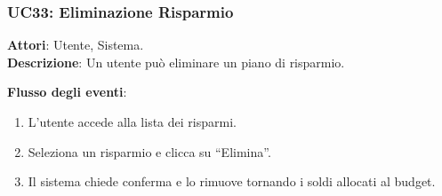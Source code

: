 \subsubsection{UC33: Eliminazione Risparmio}
\textbf{Attori}: Utente, Sistema. \\
\textbf{Descrizione}: Un utente può eliminare un piano di risparmio.

\textbf{Flusso degli eventi}:
\begin{enumerate}
    \item L’utente accede alla lista dei risparmi.
    \item Seleziona un risparmio e clicca su ``Elimina''.
    \item Il sistema chiede conferma e lo rimuove tornando i soldi allocati al budget.
\end{enumerate}

